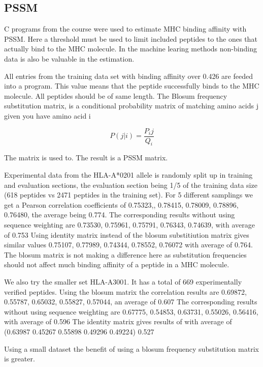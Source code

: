 
\subsection*{PSSM}

C programs from the course were used to estimate MHC binding affinity with PSSM. 
Here a threshold must be used to limit included peptides to the ones that actually bind to the MHC molecule. 
In the machine learing methods non-binding data is also be valuable in the estimation.

All entries from the training data set with binding affinity over 0.426 are feeded into a program. 
This value means that the peptide successfully binds to the MHC molecule. All peptides should be of same length.
The Blosum frequency substitution matrix, is a
conditional probability matrix of matching amino
acids j given you have amino acid i

\begin{equation}
P(j|i) = \frac{P_ij}{Q_i}
\end{equation}

The matrix is used to. The result is a PSSM matrix. 

Experimental data from the HLA-A*0201 allele is randomly split up in training and evaluation sections, the evaluation section being 1/5 of the training data size (618 peptides vs 2471 peptides in the training set).
For 5 different samplings we get a Pearson correlation coefficients of {0.75323,, 0.78415, 0.78009, 0.78896, 0.76480}, the average being 0.774.
The corresponding results without using sequence weighting are {0.73530, 0.75961, 0.75791, 0.76343, 0.74639}, with average of 0.753
Using identity matrix instead of the blosum substitiution matrix gives similar values {0.75107, 0.77989, 0.74344, 0.78552, 0.76072} with average of 0.764.
The blosum matrix is not making a difference here as substitution frequencies should not affect much binding affinity of a peptide in a MHC molecule.

We also try the smaller set HLA-A3001. It has a total of 669 experimentally verified peptides.
Using the blosum matrix the correlation results are {0.69872, 0.55787, 0.65032, 0.55827, 0.57044}, an average of 0.607
The corresponding results without using sequence weighting are {0.67775, 0.54853, 0.63731, 0.55026, 0.56416}, with average of 0.596
The identity matrix gives results of with average of (0.63987 0.45267 0.55898 0.49296 0.49224) 0.527 

Using a small dataset the benefit of using a blosum frequency substitution matrix is greater.

